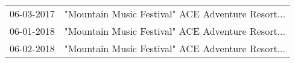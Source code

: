 \begin{supertabular}{ll}
 06-03-2017 &  "Mountain Music Festival" ACE Adventure Resort... \\
 06-01-2018 &  "Mountain Music Festival" ACE Adventure Resort... \\
 06-02-2018 &  "Mountain Music Festival" ACE Adventure Resort... \\
\end{supertabular}
